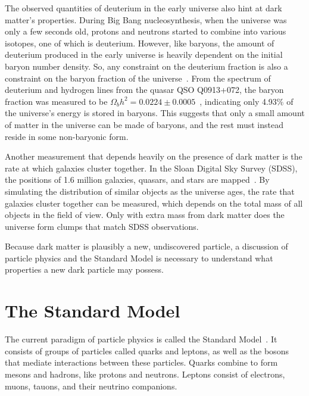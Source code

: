 The observed quantities of deuterium in the early universe also hint at dark matter's properties.
During Big Bang nucleosynthesis, when the universe was only a few seconds old, protons and neutrons started to combine into various isotopes, one of which is deuterium.
However, like baryons, the amount of deuterium produced in the early universe is heavily dependent on the initial baryon number density.
So, any constraint on the deuterium fraction is also a constraint on the baryon fraction of the universe~\cite{deuterium1,deuterium2}.
From the spectrum of deuterium and hydrogen lines from the quasar QSO Q0913+072, the baryon fraction was measured to be $\Omega_{b}h^2 = 0.0224 \pm 0.0005$~\cite{deuterium3}, indicating only 4.93\% of the universe's energy is stored in baryons.
This suggests that only a small amount of matter in the universe can be made of baryons, and the rest must instead reside in some non-baryonic form.

Another measurement that depends heavily on the presence of dark matter is the rate at which galaxies cluster together.
In the Sloan Digital Sky Survey (SDSS), the positions of 1.6 million galaxies, quasars, and stars are mapped~\cite{sdss_release}.
By simulating the distribution of similar objects as the universe ages, the rate that galaxies cluster together can be measured, which depends on the total mass of all objects in the field of view.
Only with extra mass from dark matter does the universe form clumps that match SDSS observations.

Because dark matter is plausibly a new, undiscovered particle, a discussion of particle physics and the Standard Model is necessary to understand what properties a new dark particle may possess.

\section{The Standard Model}

The current paradigm of particle physics is called the Standard Model~\cite{standardmodel}.
It consists of groups of particles called quarks and leptons, as well as the bosons that mediate interactions between these particles.
Quarks combine to form mesons and hadrons, like protons and neutrons.
Leptons consist of electrons, muons, tauons, and their neutrino companions.

